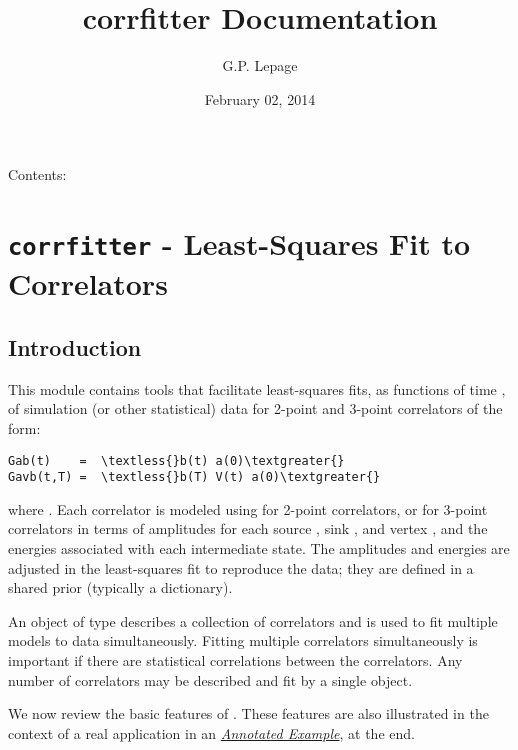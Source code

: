 \documentclass[letterpaper,10pt,english]{sphinxmanual}
\title{corrfitter Documentation}
\date{February 02, 2014}
\author{G.P. Lepage}
\begin{document}
\maketitle
\tableofcontents
{}\label{index::doc}


Contents:


\chapter{\texttt{corrfitter} - Least-Squares Fit to Correlators}
\label{corrfitter:corrfitter-documentation}\label{corrfitter::doc}\label{corrfitter:corrfitter-least-squares-fit-to-correlators}

\section{Introduction}
\label{corrfitter:introduction}
This module contains tools that facilitate least-squares fits, as functions
of time , of simulation (or other statistical) data for 2-point and
3-point correlators of the form:

\begin{Verbatim}[commandchars=\\\{\}]
Gab(t)    =  \textless{}b(t) a(0)\textgreater{}
Gavb(t,T) =  \textless{}b(T) V(t) a(0)\textgreater{}
\end{Verbatim}

where . Each correlator is modeled using {\hyperref[corrfitter:corrfitter.Corr2]{}} for 2-point
correlators, or {\hyperref[corrfitter:corrfitter.Corr3]{}} for 3-point correlators in terms of amplitudes for
each source , sink , and vertex , and the energies
associated with each intermediate state. The amplitudes and energies are
adjusted in the least-squares fit to reproduce the data; they are defined
in a shared prior (typically a dictionary).

An object of type {\hyperref[corrfitter:corrfitter.CorrFitter]{}} describes a collection of correlators and is
used to fit multiple models to data simultaneously. Fitting multiple
correlators simultaneously is important if there are statistical
correlations between the correlators. Any number of correlators may be
described and fit by a single {\hyperref[corrfitter:corrfitter.CorrFitter]{}} object.

We now review the basic features of . These features are also
illustrated in the context of a real application in an
{\hyperref[corrfitter:annotated-example]{\emph{Annotated Example}}}, at the end.
\end{document}
